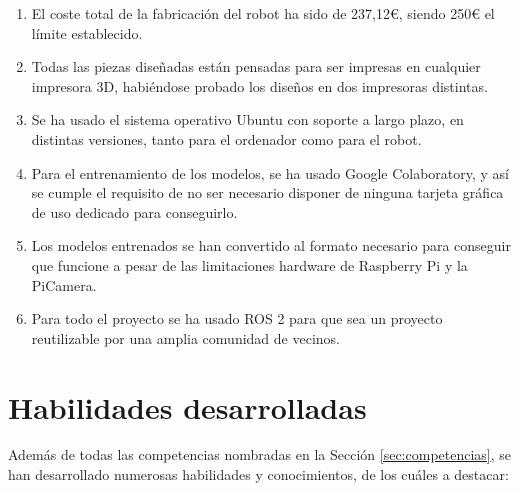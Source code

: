 \begin{enumerate}
	\item El coste total de la fabricación del robot ha sido de 237,12€, siendo 250€ el límite establecido.
	\item Todas las piezas diseñadas están pensadas para ser impresas en cualquier impresora 3D, habiéndose probado los diseños en dos impresoras distintas.
	\item Se ha usado el sistema operativo Ubuntu con soporte a largo plazo, en distintas versiones, tanto para el ordenador como para el robot.
	\item Para el entrenamiento de los modelos, se ha usado Google Colaboratory, y así se cumple el requisito de no ser necesario disponer de ninguna tarjeta gráfica de uso dedicado para conseguirlo.
	\item Los modelos entrenados se han convertido al formato necesario para conseguir que funcione a pesar de las limitaciones hardware de Raspberry Pi y la PiCamera.
	\item Para todo el proyecto se ha usado ROS 2 para que sea un proyecto reutilizable por una amplia comunidad de vecinos.
\end{enumerate}

\section{Habilidades desarrolladas}

Además de todas las competencias nombradas en la Sección \ref{sec:competencias}, se han desarrollado numerosas habilidades y conocimientos, de los cuáles a destacar: 

